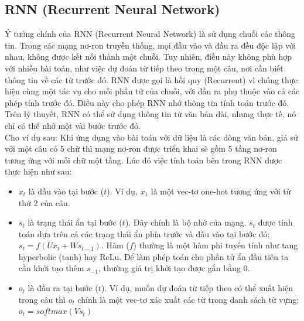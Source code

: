 \documentclass[conference]{IEEEtran}
\begin{document}
\subsection{RNN (Recurrent Neural Network)}
Ý tưởng chính của RNN (Recurrent Neural Network) là sử dụng chuỗi các thông tin. Trong các mạng nơ-ron truyền thống, mọi đầu vào và đầu ra đều độc lập với nhau, không được kết nối thành một chuỗi. Tuy nhiên, điều này không phù hợp với nhiều bài toán, như việc dự đoán từ tiếp theo trong một câu, nơi cần biết thông tin về các từ trước đó. RNN được gọi là hồi quy (Recurrent) vì chúng thực hiện cùng một tác vụ cho mỗi phần tử của chuỗi, với đầu ra phụ thuộc vào cả các phép tính trước đó. Điều này cho phép RNN nhớ thông tin tính toán trước đó. Trên lý thuyết, RNN có thể sử dụng thông tin từ văn bản dài, nhưng thực tế, nó chỉ có thể nhớ một vài bước trước đó.\\
Cho ví dụ sau: Khi ứng dụng vào bài toán với dữ liệu là các dòng văn bản, giả sử với một câu có 5 chữ thì mạng nơ-ron được triển khai sẽ gồm 5 tầng nơ-ron tương ứng với mỗi chữ một tầng. Lúc đó việc tính toán bên trong RNN được thực hiện như sau:\\
\begin{itemize}
  \item $x_{t}$ là đầu vào tại bước ($t$). Ví dụ, $x_{1}$ là một vec-tơ one-hot tương ứng với từ thứ 2 của câu.
  \item $s_{t}$ là trạng thái ẩn tại bước ($t$). Đây chính là bộ nhớ của mạng. $s_{t}$ được tính toán dựa trên cả các trạng thái ẩn phía trước và đầu vào tại bước đó: $s_{t} = f(Ux_{t} + Ws_{t-1})$. Hàm ($f$) thường là một hàm phi tuyến tính như tang hyperbolic (tanh) hay ReLu. Để làm phép toán cho phần tử ẩn đầu tiên ta cần khởi tạo thêm $s_{-1}$, thường giá trị khởi tạo được gắn bằng 0.
  \item $o_{t}$ là đầu ra tại bước ($t$). Ví dụ, muốn dự đoán từ tiếp theo có thể xuất hiện trong câu thì $o_{t}$ chính là một vec-tơ xác xuất các từ trong danh sách từ vựng: $o_{t} = softmax(Vs_{t})$
\end{itemize}
\end{document}
